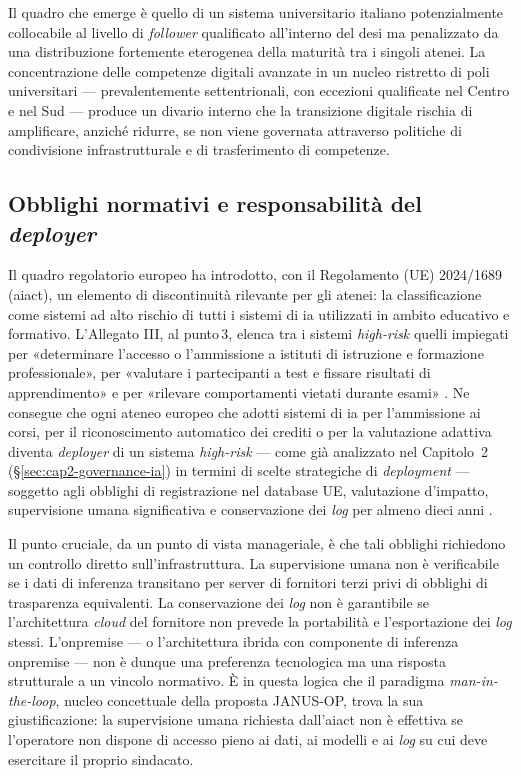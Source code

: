 Il quadro che emerge è quello di un sistema universitario italiano potenzialmente
collocabile al livello di \textit{follower} qualificato all'interno del \gls{desi} ma
penalizzato da una distribuzione fortemente eterogenea della maturità tra i singoli
atenei. La concentrazione delle competenze digitali avanzate in un nucleo ristretto di
poli universitari --- prevalentemente settentrionali, con eccezioni qualificate nel
Centro e nel Sud --- produce un divario interno che la transizione digitale rischia di
amplificare, anziché ridurre, se non viene governata attraverso politiche di
condivisione infrastrutturale e di trasferimento di competenze.

\subsection{Obblighi normativi e responsabilità del \textit{deployer}}

Il quadro regolatorio europeo ha introdotto, con il Regolamento (UE) 2024/1689 (\gls{aiact}),
un elemento di discontinuità rilevante per gli atenei: la classificazione come
sistemi ad alto rischio di tutti i sistemi di \gls{ia} utilizzati in ambito
educativo e formativo. L'Allegato III, al punto\,3, elenca tra i sistemi
\textit{high-risk} quelli impiegati per «determinare l'accesso o l'ammissione a istituti
di istruzione e formazione professionale», per «valutare i partecipanti a test e fissare
risultati di apprendimento» e per «rilevare comportamenti vietati durante esami»
\parencite{AIAct2024}. Ne consegue che ogni ateneo europeo che adotti sistemi di \gls{ia} per
l'ammissione ai corsi, per il riconoscimento automatico dei crediti o per la valutazione
adattiva diventa \textit{deployer} di un sistema \textit{high-risk} --- come già
analizzato nel Capitolo~2 (§\ref{sec:cap2-governance-ia}) in termini di scelte
strategiche di \textit{deployment} --- soggetto agli obblighi di registrazione nel
database UE, valutazione d'impatto, supervisione umana significativa e conservazione
dei \textit{log} per almeno dieci anni \parencite{HohmannKollar2025}.

Il punto cruciale, da un punto di vista manageriale, è che tali obblighi richiedono un
controllo diretto sull'infrastruttura. La supervisione umana non è verificabile
se i dati di inferenza transitano per server di fornitori terzi privi di obblighi di
trasparenza equivalenti. La conservazione dei \textit{log} non è garantibile se
l'architettura \textit{cloud} del fornitore non prevede la portabilità e l'esportazione
dei \textit{log} stessi. L'\gls{onpremise} --- o l'architettura ibrida con componente
di inferenza \gls{onpremise} --- non è dunque una preferenza tecnologica ma una
risposta strutturale a un vincolo normativo. È in questa logica che il paradigma
\textit{man-in-the-loop}, nucleo concettuale della proposta JANUS-OP, trova la sua
giustificazione: la supervisione umana richiesta dall'\gls{aiact} non è effettiva se
l'operatore non dispone di accesso pieno ai dati, ai modelli e ai \textit{log} su cui
deve esercitare il proprio sindacato.

